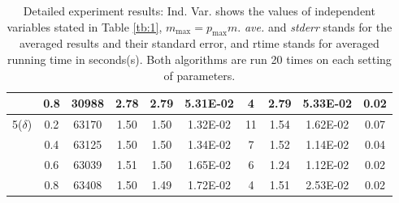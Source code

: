 \documentclass{scrartcl}
\begin{document}
\begin{table}[h]
\begin{tabularx}{\textwidth}{c|c|c|c|ccc|ccc}
 & 0.8 & 30988 & 2.78 & 2.79 & 5.31E-02 & 4 & 2.79 & 5.33E-02 & 0.02\\
\midrule
5($\delta$) & 0.2 & 63170 & 1.50 & 1.50 & 1.32E-02 & 11 & 1.54 & 1.62E-02 & 0.07\\
 & 0.4 & 63125 & 1.50 & 1.50 & 1.34E-02 & 7 & 1.52 & 1.14E-02 & 0.04\\
 & 0.6 & 63039 & 1.51 & 1.50 & 1.65E-02 & 6 & 1.24 & 1.12E-02 & 0.02\\
 & 0.8 & 63408 & 1.50 & 1.49 & 1.72E-02 & 4 & 1.51 & 2.53E-02 & 0.02\\
\bottomrule
\end{tabularx}
\caption{Detailed experiment results: Ind. Var. shows the values of independent variables stated in Table \ref{tb:1}, $m_{\max}=p_{\max}m$. \emph{ave.} and \emph{stderr} stands for the averaged results and their standard error, and rtime stands for averaged running time in seconds(s). Both algorithms are run 20 times on each setting of parameters.}
\label{tb:2}
\end{table}

\end{document}
